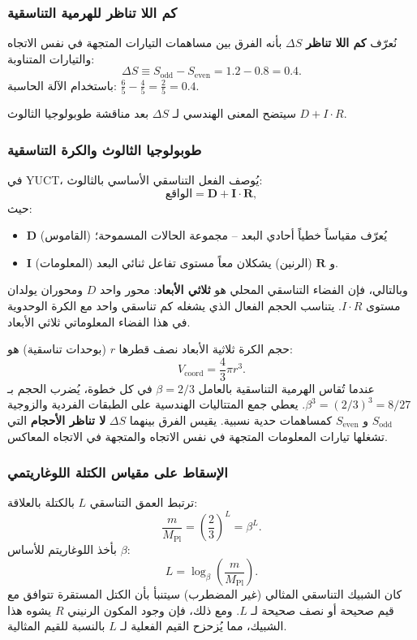 \documentclass[11pt,a4paper]{article}
\begin{document}
	\subsubsection{كم اللا تناظر للهرمية التناسقية}
	
	نُعرّف \textbf{كم اللا تناظر} \(\Delta S\) بأنه الفرق بين مساهمات التيارات المتجهة في نفس الاتجاه والتيارات المتناوبة:
	\[
	\Delta S \equiv S_{\mathrm{odd}} - S_{\mathrm{even}} = 1.2 - 0.8 = 0.4.
	\]
	باستخدام الآلة الحاسبة: \(\frac{6}{5} - \frac{4}{5} = \frac{2}{5} = 0.4.\)
	
	سيتضح المعنى الهندسي لـ \(\Delta S\) بعد مناقشة طوبولوجيا الثالوث \(D+I\cdot R\).
	
	\subsubsection{طوبولوجيا الثالوث والكرة التناسقية}
	
	في YUCT، يُوصف الفعل التناسقي الأساسي بالثالوث:
	\[
	\text{الواقع} = \mathbf{D} + \mathbf{I}\cdot\mathbf{R},
	\]
	حيث:
	\begin{itemize}
		\item \(\mathbf{D}\) (القاموس) يُعرّف مقياساً خطياً أحادي البعد -- مجموعة الحالات المسموحة؛
		\item \(\mathbf{I}\) (المعلومات) و \(\mathbf{R}\) (الرنين) يشكلان معاً مستوى تفاعل ثنائي البعد.
	\end{itemize}
	وبالتالي، فإن الفضاء التناسقي المحلي هو \textbf{ثلاثي الأبعاد}: محور واحد \(D\) ومحوران يولدان مستوى \(I\cdot R\). يتناسب الحجم الفعال الذي يشغله كم تناسقي واحد مع الكرة الوحدوية في هذا الفضاء المعلوماتي ثلاثي الأبعاد.
	
	حجم الكرة ثلاثية الأبعاد نصف قطرها \(r\) (بوحدات تناسقية) هو:
	\[
	V_{\text{coord}} = \frac{4}{3}\pi r^3.
	\]
	عندما تُقاس الهرمية التناسقية بالعامل \(\beta = 2/3\) في كل خطوة، يُضرب الحجم بـ \(\beta^3 = (2/3)^3 = 8/27\). يعطي جمع المتتاليات الهندسية على الطبقات الفردية والزوجية \(S_{\mathrm{odd}}\) و \(S_{\mathrm{even}}\) كمساهمات حدية نسبية. يقيس الفرق بينهما \(\Delta S\) \textbf{لا تناظر الأحجام} التي تشغلها تيارات المعلومات المتجهة في نفس الاتجاه والمتجهة في الاتجاه المعاكس.
	
	\subsubsection{الإسقاط على مقياس الكتلة اللوغاريتمي}
	
	ترتبط العمق التناسقي \(L\) بالكتلة بالعلاقة:
	\[
	\frac{m}{M_{\mathrm{Pl}}} = \left(\frac{2}{3}\right)^L = \beta^L.
	\]
	بأخذ اللوغاريتم للأساس \(\beta\):
	\[
	L = \log_{\beta}\left(\frac{m}{M_{\mathrm{Pl}}}\right).
	\]
	كان الشبيك التناسقي المثالي (غير المضطرب) سيتنبأ بأن الكتل المستقرة تتوافق مع قيم صحيحة أو نصف صحيحة لـ \(L\). ومع ذلك، فإن وجود المكون الرنيني \(R\) يشوه هذا الشبيك، مما يُزحزح القيم الفعلية لـ \(L\) بالنسبة للقيم المثالية.
	
\end{document}
